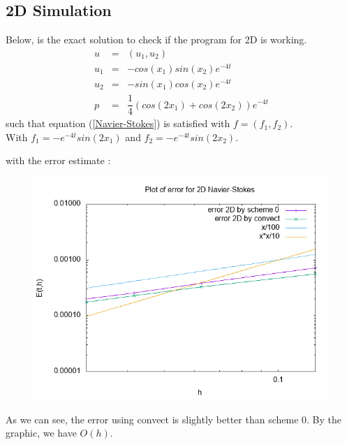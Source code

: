 \documentclass[a4paper,10pt]{article}
\begin{document}
\newpage
\subsection{ 2D Simulation}
Below, is the exact solution to check if the program for 2D is working.
\begin{eqnarray} \nonumber
u &=& (u_{1},u_{2})\\ \nonumber
u_{1} &=& -cos(x_{1}) sin(x_{2}) e^{-4t} \\\nonumber
u_{2} &=& -sin(x_{1}) cos(x_{2}) e^{-4t} \\\nonumber
p &=& \dfrac{1}{4} (cos(2x_{1}) + cos(2x_{2})) e^{-4t}
\end{eqnarray}
such that equation (\ref{Navier-Stokes}) is satisfied with $ f = (f_{1},f_{2}) $. \\With $ f_{1} = -e^{-4t}sin(2x_{1}) $ and $ f_{2} = -e^{-4t} sin(2x_{2}) $.

with the error estimate :
\begin{figure}[h!]
	\centering
	\includegraphics[width=0.7\linewidth]{NS_2D/error_NS_2D}
	\caption{}
	\label{fig:errorns2d}
\end{figure}

As we can see, the error using convect is slightly better than scheme $ 0 $. By the graphic, we have $ O(h) $.
\end{document}
